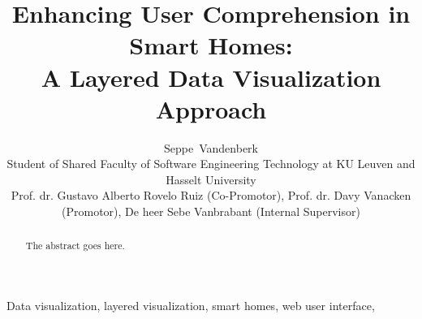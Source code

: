 \documentclass[journal]{IEEEtran}
\begin{document}
%
\title{Enhancing User Comprehension in Smart Homes: \\ A Layered Data Visualization Approach}
%
%
%

\author{Seppe~Vandenberk \\
        Student of Shared Faculty of Software Engineering Technology at KU Leuven and Hasselt University \\
        Prof. dr. Gustavo Alberto Rovelo Ruiz (Co-Promotor), Prof. dr. Davy Vanacken (Promotor), De heer Sebe Vanbrabant (Internal Supervisor) %
    }

\maketitle

\begin{abstract}
The abstract goes here.
\end{abstract}

\begin{IEEEkeywords}
Data visualization, layered visualization, smart homes, web user interface, 
\end{IEEEkeywords}






%
\IEEEpeerreviewmaketitle
\end{document}
